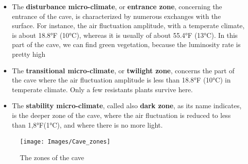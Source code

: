 \documentclass{article}
\begin{document}
\begin{itemize}[label=$\square$]
  \item The \textbf{disturbance micro-climate}, or \textbf{entrance zone}, concerning the entrance of the cave, is characterized by numerous exchanges with the surface. For instance, the air fluctuation amplitude, with a temperate climate, is about 18.8°F (10°C), whereas it is usually of about 55.4°F (13°C). In this part of the cave, we can find green vegetation, because the luminosity rate is pretty high

  \item The \textbf{transitional micro-climate}, or \textbf{twilight zone}, concerns the part of the cave where the air fluctuation amplitude is less than 18.8°F (10°C) in temperate climate. Only a few resistants plants survive here.

  \item The \textbf{stability micro-climate}, called also \textbf{dark zone},  as its name indicates, is the deeper zone of the cave, where the air fluctuation is reduced to less than 1,8°F(1°C), and where there is no more light.

\end{itemize}
\begin{figure}[!ht]
  \centering
  \texttt{[image: Images/Cave\_zones]}
  \caption{The zones of the cave \cite{CaveZones}}
  \label{Cave_zones}
\end{figure}

\newpage
\end{document}
